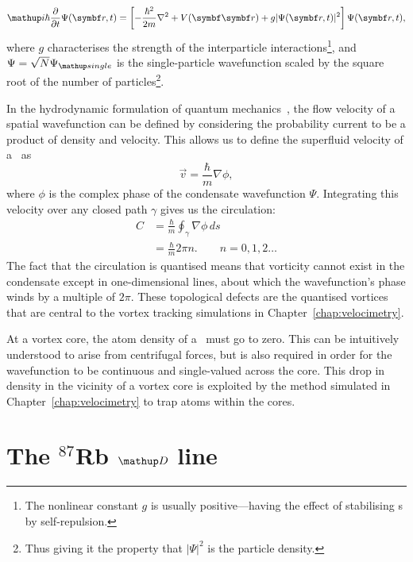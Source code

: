\begin{align}
\ii\hbar\pdv{t} \Psi(\vec r, t) = \left[-\frac{\hbar^2}{2m}\nabla^2 + V(\vec{\vec r}) + g|\Psi(\vec r, t)|^2\right]\Psi(\vec r, t),
\end{align}
where $g$ characterises the strength of the interparticle interactions\footnote{The nonlinear constant $g$ is usually positive---having the effect of stabilising \bec s by self-repulsion.}, and $\Psi = \sqrt{N}\Psi_\up{single}$ is the single-particle wavefunction scaled by the square root of the number of particles\footnote{Thus giving it the property that $|\Psi|^2$ is the particle density.}.

In the hydrodynamic formulation of quantum mechanics~\cite{madelung_quantentheorie_1927}, the flow velocity of a spatial wavefunction can be defined by considering the probability current to be a product of density and velocity. This allows us to define the superfluid velocity of a \bec\ as
\begin{equation}
\vec v = \frac\hbar m \nabla\phi,
\end{equation}
where $\phi$ is the complex phase of the condensate wavefunction $\Psi$. Integrating this velocity over any closed path $\gamma$ gives us the circulation:
\begin{align}
C &= \frac\hbar m\oint_\gamma\nabla\phi\,ds\\
  &= \frac\hbar m 2\pi n.\qquad n=0,1,2\dots
\end{align}
The fact that the circulation is quantised means that vorticity cannot exist in the condensate except in one-dimensional lines, about which the wavefunction's phase winds by a multiple of $2\pi$. These topological defects are the quantised vortices that are central to the vortex tracking simulations in Chapter~\ref{chap:velocimetry}.

At a vortex core, the atom density of a \bec\ must go to zero. This can be intuitively understood to arise from centrifugal forces, but is also required in order for the wavefunction to be continuous and single-valued across the core. This drop in density in the vicinity of a vortex core is exploited by the method simulated in Chapter~\ref{chap:velocimetry} to trap atoms within the cores.

\section{The $^{87}$Rb $\up{D}$ line}\label{sec:the_rubidium_D_line}

